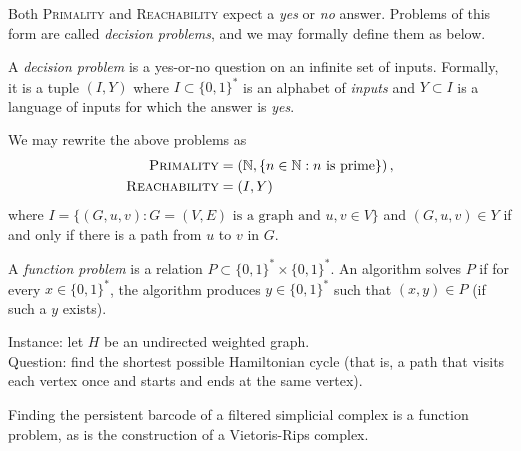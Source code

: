 Both \textsc{Primality} and \textsc{Reachability} expect a \emph{yes} or \emph{no} answer. Problems of this form are called \emph{decision problems}, and we may formally define them as below.

\begin{definition} \label{def:decision-problem}
    A \emph{decision problem} is a yes-or-no question on an infinite set of inputs. Formally, it is a tuple $(I, Y)$ where $I \subset \{0,1\}^*$ is an alphabet of \emph{inputs} and $Y \subset I$ is a language of inputs for which the answer is \emph{yes}.
\end{definition}

We may rewrite the above problems as
\begin{align*}
    \textsc{Primality}    & = \left(\mathbb N, \{n \in \mathbb N: \text{$n$ is prime}\}\right), \\
    \textsc{Reachability} & = \left(I, Y\right)
\end{align*}
where $I = \{(G, u, v): \text{$G = (V,E)$ is a graph and $u, v \in V$}\}$ and $(G, u, v) \in Y$ if and only if there is a path from $u$ to $v$ in $G$.

\begin{definition} \label{def:function-problem}
    A \emph{function problem} is a relation $P \subset \{0,1\}^* \times \{0,1\}^*$. An algorithm solves $P$ if for every $x \in \{0,1\}^*$, the algorithm produces $y \in \{0,1\}^*$ such that $(x,y) \in P$ (if such a $y$ exists).
\end{definition}

\begin{problem} \label{pro:tsp}
    Instance: let $H$ be an undirected weighted graph. \\ 
    Question: find the shortest possible Hamiltonian cycle (that is, a path that visits each vertex once and starts and ends at the same vertex).
\end{problem}

Finding the persistent barcode of a filtered simplicial complex is a function problem, as is the construction of a Vietoris-Rips complex. 